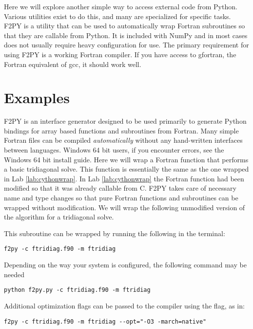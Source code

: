 \label{lab:f2py}

Here we will explore another simple way to access external code from Python.
Various utilities exist to do this, and many are specialized for specific tasks.
F2PY is a utility that can be used to automatically wrap Fortran subroutines so that they are callable from Python.
It is included with NumPy and in most cases does not usually require heavy configuration for use.
The primary requirement for using F2PY is a working Fortran compiler.
If you have access to gfortran, the Fortran equivalent of gcc, it should work well.

\section*{Examples}

F2PY is an interface generator designed to be used primarily to generate Python bindings for array based functions and subroutines from Fortran.
Many simple Fortran files can be compiled \emph{automatically} without any hand-written interfaces between languages.
Windows 64 bit users, if you encounter errors, see the Windows 64 bit install guide.
Here we will wrap a Fortran function that performs a basic tridiagonal solve.
This function is essentially the same as the one wrapped in Lab \ref{lab:cythonwrap}.
In Lab \ref{lab:cythonwrap} the Fortran function had been modified so that it was already callable from C.
F2PY takes care of necessary name and type changes so that pure Fortran functions and subroutines can be wrapped without modification.
We will wrap the following unmodified version of the algorithm for a tridiagonal solve.

This subroutine can be wrapped by running the following in the terminal:
\begin{lstlisting}[style=ShellInput]
f2py -c ftridiag.f90 -m ftridiag
\end{lstlisting}
Depending on the way your system is configured, the following command may be needed
\begin{lstlisting}[style=ShellInput]
python f2py.py -c ftridiag.f90 -m ftridiag
\end{lstlisting}
Additional optimization flags can be passed to the compiler using the  flag, as in:
\begin{lstlisting}[style=ShellInput]
f2py -c ftridiag.f90 -m ftridiag --opt="-O3 -march=native"
\end{lstlisting}

